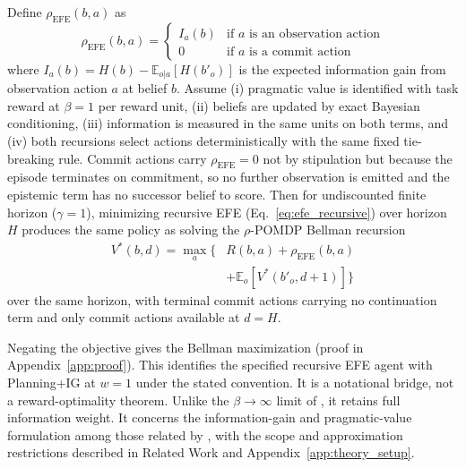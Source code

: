 \documentclass[runningheads]{llncs}
\begin{document}
\begin{proposition}
\label{prop:equivalence}
Define $\rho_{\mathrm{EFE}}(b, a)$ as
\begin{equation*}
    \rho_{\mathrm{EFE}}(b, a) = \begin{cases} I_a(b) & \text{if } a \text{ is an observation action} \\ 0 & \text{if } a \text{ is a commit action} \end{cases}
\end{equation*}
where $I_a(b) = H(b) - \mathbb{E}_{o|a}[H(b'_o)]$ is the expected information gain from observation action $a$ at belief $b$. Assume (i) pragmatic value is identified with task reward at $\beta{=}1$ per reward unit, (ii) beliefs are updated by exact Bayesian conditioning, (iii) information is measured in the same units on both terms, and (iv) both recursions select actions deterministically with the same fixed tie-breaking rule. Commit actions carry $\rho_{\mathrm{EFE}}{=}0$ not by stipulation but because the episode terminates on commitment, so no further observation is emitted and the epistemic term has no successor belief to score. Then for undiscounted finite horizon ($\gamma{=}1$), minimizing recursive EFE (Eq.~\ref{eq:efe_recursive}) over horizon $H$ produces the same policy as solving the $\rho$-POMDP Bellman recursion
\begin{align*}
V^*(b,d)=\max_a\big\{&R(b,a)+\rho_{\mathrm{EFE}}(b,a)\\
&+\mathbb E_o[V^*(b'_o,d+1)]\big\}
\end{align*}
over the same horizon, with terminal commit actions carrying no continuation term and only commit actions available at $d=H$.
\end{proposition}

Negating the objective gives the Bellman maximization (proof in Appendix~\ref{app:proof}). This identifies the specified recursive EFE agent with Planning+IG at $w=1$ under the stated convention. It is a notational bridge, not a reward-optimality theorem. Unlike the $\beta\to\infty$ limit of \citet{dacosta2020b}, it retains full information weight. It concerns the information-gain and pragmatic-value formulation among those related by \citet{champion2024}, with the scope and approximation restrictions described in Related Work and Appendix~\ref{app:theory_setup}.
\end{document}
